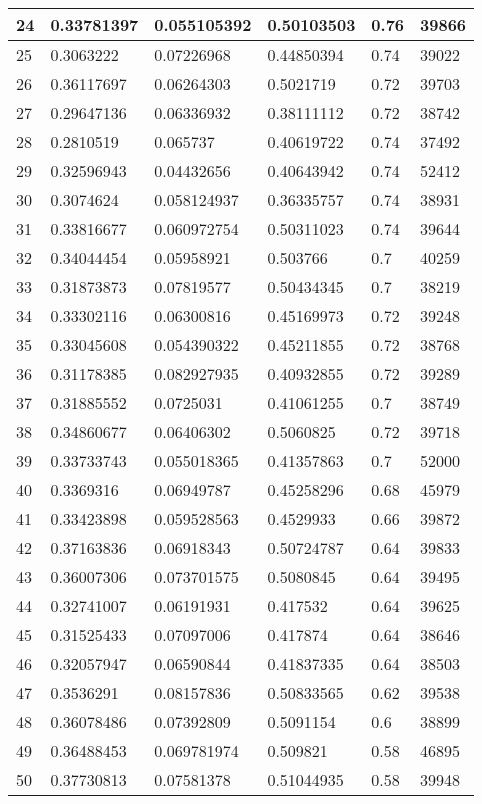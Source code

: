 \begin{longtable}{|l|l|l|l|l|l|}
24 & 0.33781397 & 0.055105392 & 0.50103503 & 0.76 & 39866 \\ \hline 
25 & 0.3063222 & 0.07226968 & 0.44850394 & 0.74 & 39022 \\ \hline 
26 & 0.36117697 & 0.06264303 & 0.5021719 & 0.72 & 39703 \\ \hline 
27 & 0.29647136 & 0.06336932 & 0.38111112 & 0.72 & 38742 \\ \hline 
28 & 0.2810519 & 0.065737 & 0.40619722 & 0.74 & 37492 \\ \hline 
29 & 0.32596943 & 0.04432656 & 0.40643942 & 0.74 & 52412 \\ \hline 
30 & 0.3074624 & 0.058124937 & 0.36335757 & 0.74 & 38931 \\ \hline 
31 & 0.33816677 & 0.060972754 & 0.50311023 & 0.74 & 39644 \\ \hline 
32 & 0.34044454 & 0.05958921 & 0.503766 & 0.7 & 40259 \\ \hline 
33 & 0.31873873 & 0.07819577 & 0.50434345 & 0.7 & 38219 \\ \hline 
34 & 0.33302116 & 0.06300816 & 0.45169973 & 0.72 & 39248 \\ \hline 
35 & 0.33045608 & 0.054390322 & 0.45211855 & 0.72 & 38768 \\ \hline 
36 & 0.31178385 & 0.082927935 & 0.40932855 & 0.72 & 39289 \\ \hline 
37 & 0.31885552 & 0.0725031 & 0.41061255 & 0.7 & 38749 \\ \hline 
38 & 0.34860677 & 0.06406302 & 0.5060825 & 0.72 & 39718 \\ \hline 
39 & 0.33733743 & 0.055018365 & 0.41357863 & 0.7 & 52000 \\ \hline 
40 & 0.3369316 & 0.06949787 & 0.45258296 & 0.68 & 45979 \\ \hline 
41 & 0.33423898 & 0.059528563 & 0.4529933 & 0.66 & 39872 \\ \hline 
42 & 0.37163836 & 0.06918343 & 0.50724787 & 0.64 & 39833 \\ \hline 
43 & 0.36007306 & 0.073701575 & 0.5080845 & 0.64 & 39495 \\ \hline 
44 & 0.32741007 & 0.06191931 & 0.417532 & 0.64 & 39625 \\ \hline 
45 & 0.31525433 & 0.07097006 & 0.417874 & 0.64 & 38646 \\ \hline 
46 & 0.32057947 & 0.06590844 & 0.41837335 & 0.64 & 38503 \\ \hline 
47 & 0.3536291 & 0.08157836 & 0.50833565 & 0.62 & 39538 \\ \hline 
48 & 0.36078486 & 0.07392809 & 0.5091154 & 0.6 & 38899 \\ \hline 
49 & 0.36488453 & 0.069781974 & 0.509821 & 0.58 & 46895 \\ \hline 
50 & 0.37730813 & 0.07581378 & 0.51044935 & 0.58 & 39948 \\ \hline 
\end{longtable}